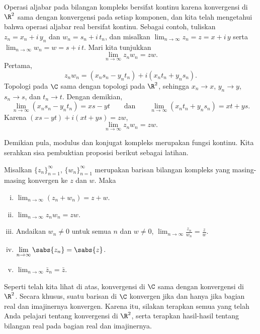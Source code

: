 Operasi aljabar pada bilangan kompleks bersifat kontinu karena konvergensi di
$\R^2$ sama dengan konvergensi pada setiap komponen, dan kita telah mengetahui
bahwa operasi aljabar real bersifat kontinu. Sebagai contoh,
tuliskan $z_n = x_n + i\,y_n$ dan
$w_n = s_n + i\,t_n$, dan misalkan
$\lim_{n\to\infty} z_n = z = x+i\,y$ serta $\lim_{n\to\infty} w_n = w = s+i\,t$.
Mari kita tunjukkan
\begin{equation*}
\lim_{n\to\infty} z_n w_n = zw .
\end{equation*}
Pertama,
\begin{equation*}
z_n w_n = (x_ns_n-y_nt_n) + i(x_nt_n+y_ns_n) .
\end{equation*}
Topologi pada $\C$ sama dengan topologi pada $\R^2$, sehingga
$x_n \to x$, $y_n \to y$, $s_n \to s$, dan $t_n \to t$.
Dengan demikian,
\begin{equation*}
\lim_{n\to\infty} (x_ns_n-y_nt_n) = xs-yt \qquad \text{dan} \qquad
\lim_{n\to\infty} (x_nt_n+y_ns_n) = xt+ys .
\end{equation*}
Karena
$(xs-yt)+i(xt+ys) = zw$,
\begin{equation*}
\lim_{n\to\infty} z_n w_n = zw .
\end{equation*}

Demikian pula, modulus dan konjugat kompleks merupakan fungsi kontinu. Kita
serahkan sisa pembuktian proposisi berikut sebagai latihan.

\begin{prop} \label{prop:continuityofcomplex}
Misalkan $\{ z_n \}_{n=1}^\infty$, $\{ w_n \}_{n=1}^\infty$ merupakan barisan bilangan kompleks yang masing-masing konvergen
ke $z$ dan $w$. Maka
\begin{enumerate}[(i)]
\item
$\displaystyle \lim_{n\to \infty} (z_n + w_n) = z + w$.
\item
$\displaystyle \lim_{n\to \infty} z_n w_n = z w$.
\item
Andaikan $w_n \neq 0$ untuk semua $n$ dan $w \neq 0$,
$\displaystyle \lim_{n\to \infty} \frac{z_n}{w_n} = \frac{z}{w}$.
\item
$\displaystyle \lim_{n\to \infty} \sabs{z_n} = \sabs{z}$.
\item
$\displaystyle \lim_{n\to \infty} \bar{z}_n = \bar{z}$.
\end{enumerate}
\end{prop}

Seperti telah kita lihat di atas, konvergensi di $\C$ sama dengan konvergensi di
$\R^2$. Secara khusus, suatu barisan di $\C$ konvergen jika dan hanya jika
bagian real dan imajinernya konvergen. Karena itu, silakan terapkan
semua yang telah Anda pelajari tentang konvergensi di $\R^2$, serta
terapkan hasil-hasil tentang bilangan real pada bagian real dan imajinernya.

